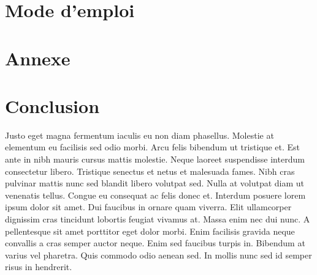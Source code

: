 \documentclass[french,a4paper,11pt]{article}
\begin{document}
\section{Mode d'emploi}

\section{Annexe}

\section{Conclusion}
Justo eget magna fermentum iaculis eu non diam phasellus. Molestie at elementum eu facilisis sed odio morbi. Arcu felis bibendum ut tristique et. Est ante in nibh mauris cursus mattis molestie. Neque laoreet suspendisse interdum consectetur libero. Tristique senectus et netus et malesuada fames. Nibh cras pulvinar mattis nunc sed blandit libero volutpat sed. Nulla at volutpat diam ut venenatis tellus. Congue eu consequat ac felis donec et. Interdum posuere lorem ipsum dolor sit amet. Dui faucibus in ornare quam viverra. Elit ullamcorper dignissim cras tincidunt lobortis feugiat vivamus at. Massa enim nec dui nunc. A pellentesque sit amet porttitor eget dolor morbi. Enim facilisis gravida neque convallis a cras semper auctor neque. Enim sed faucibus turpis in. Bibendum at varius vel pharetra. Quis commodo odio aenean sed. In mollis nunc sed id semper risus in hendrerit.
\end{document}
